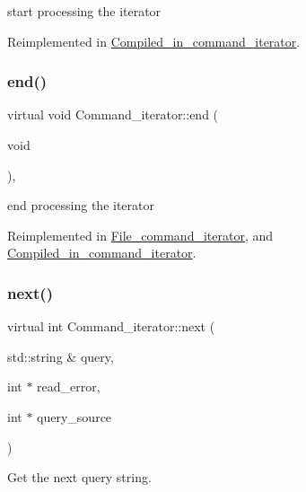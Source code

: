 start processing the iterator 

Reimplemented in \mbox{\hyperlink{classCompiled__in__command__iterator_ad68f7ccc260a9c316fb5f4970021ce04}{Compiled\+\_\+in\+\_\+command\+\_\+iterator}}.

\mbox{\label{classCommand__iterator_a564873043bc5c6e7f13916042ce320a3}} 
\subsubsection{\texorpdfstring{end()}{end()}}
{\footnotesize\ttfamily virtual void Command\+\_\+iterator\+::end (\begin{DoxyParamCaption}\item[{void}]{ }\end{DoxyParamCaption})\hspace{0.3cm}{\ttfamily [inline]}, {\ttfamily [virtual]}}

end processing the iterator 

Reimplemented in \mbox{\hyperlink{classFile__command__iterator_ad12ce1809b043f8966fcab2e70e1a1dd}{File\+\_\+command\+\_\+iterator}}, and \mbox{\hyperlink{classCompiled__in__command__iterator_a462b9632e92198deea287c08331a9137}{Compiled\+\_\+in\+\_\+command\+\_\+iterator}}.

\mbox{\label{classCommand__iterator_a582d0107e22598ec30aa7edcb8579f06}} 
\subsubsection{\texorpdfstring{next()}{next()}}
{\footnotesize\ttfamily virtual int Command\+\_\+iterator\+::next (\begin{DoxyParamCaption}\item[{std\+::string \&}]{query,  }\item[{int $\ast$}]{read\+\_\+error,  }\item[{int $\ast$}]{query\+\_\+source }\end{DoxyParamCaption})\hspace{0.3cm}{\ttfamily [pure virtual]}}

Get the next query string.


